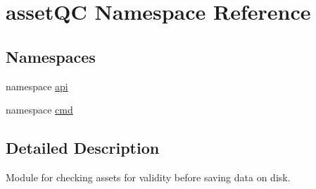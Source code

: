 \hypertarget{namespaceassetQC}{\section{asset\-Q\-C \-Namespace \-Reference}
\label{d6/d0a/namespaceassetQC}
}
\subsection*{\-Namespaces}
\begin{DoxyCompactItemize}
\item 
namespace \hyperlink{namespaceassetQC_1_1api}{api}
\item 
namespace \hyperlink{namespaceassetQC_1_1cmd}{cmd}
\end{DoxyCompactItemize}


\subsection{\-Detailed \-Description}
\begin{DoxyVerb}
Module for checking assets for validity before saving data on disk.
\end{DoxyVerb}
 